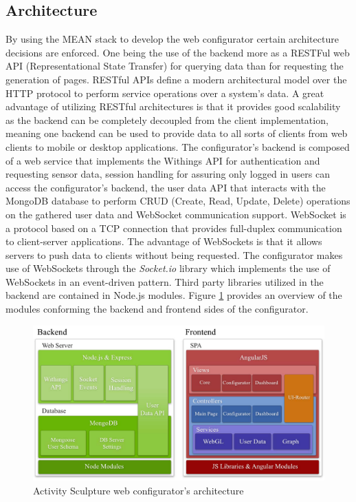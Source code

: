 \documentclass[../medieninformatik-arbeit.tex]{subfiles}
\begin{document}
\subsection{Architecture}
By using the MEAN stack to develop the web configurator certain architecture decisions are enforced. One being the use of the backend more as a RESTFul web API (Representational State Transfer) for querying data than for requesting the generation of pages. RESTful APIs define a modern architectural model over the HTTP protocol to perform service operations over a system's data\cite{Fielding:2000:PDM:337180.337228}. A great advantage of utilizing RESTful architectures is that it provides good scalability as the backend can be completely decoupled from the client implementation, meaning one backend can be used to provide data to all sorts of clients from web clients to mobile or desktop applications. The configurator's backend is composed of a web service that implements the Withings API for authentication and requesting sensor data, session handling for assuring only logged in users can access the configurator's backend, the user data API that interacts with the MongoDB database to perform CRUD (Create, Read, Update, Delete) operations on the gathered user data and WebSocket communication support. WebSocket is a protocol based on a TCP connection that provides full-duplex communication to client-server applications\cite{fette2011websocket}. The advantage of WebSockets is that it allows servers to push data to clients without being requested. The configurator makes use of WebSockets through the \textit{Socket.io}\cite{socketio} library which implements the use of WebSockets in an event-driven pattern. Third party libraries utilized in the backend are contained in Node.js modules. Figure \ref{fig:architecture} provides an overview of the modules conforming the backend and frontend sides of the configurator.  

\begin{figure}[h]
\captionsetup{width=\textwidth}
\begin{center}
  \includegraphics[width=\textwidth]{Configurator/img/Architecture}
  \caption{Activity Sculpture web configurator's architecture}
\label{fig:architecture}
\end{center}
\end{figure}
\end{document}
